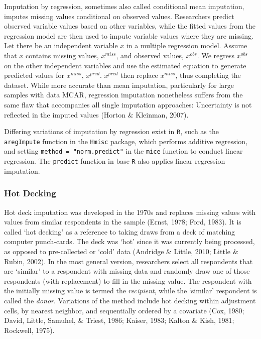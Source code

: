 \documentclass[12pt,econ]{sources/authesis}
\begin{document}
Imputation by regression, sometimes also called conditional mean imputation, imputes missing values conditional on observed values. Researchers predict observed variable values based on other variables, while the fitted values from the regression model are then used to impute variable values where they are missing. Let there be an independent variable \(x\) in a multiple regression model. Assume that \(x\) contains missing values, \(x^{miss}\), and observed values, \(x^{obs}\). We regress \(x^{obs}\) on the other independent variables and use the estimated equation to generate predicted values for \(x^{miss}\), \(x^{pred}\). \(x^{pred}\) then replace \(x^{miss}\), thus completing the dataset. While more accurate than mean imputation, particularly for large samples with data MCAR, regression imputation nonetheless suffers from the same flaw that accompanies all single imputation approaches: Uncertainty is not reflected in the imputed values (Horton \& Kleinman, 2007).

Differing variations of imputation by regression exist in \texttt{R}, such as the \texttt{aregImpute} function in the \texttt{Hmisc} package, which performs additive regression, and setting \texttt{method\ =\ "norm.predict"} in the \texttt{mice} function to conduct linear regression. The \texttt{predict} function in base \texttt{R} also applies linear regression imputation.

\hypertarget{ordmiss-theory-impute-hd}{%
\subsubsection{Hot Decking}\label{ordmiss-theory-impute-hd}}

Hot deck imputation was developed in the 1970s and replaces missing values with values from similar respondents in the sample (Ernst, 1978; Ford, 1983). It is called `hot decking' as a reference to taking draws from a deck of matching computer punch-cards. The deck was `hot' since it was currently being processed, as opposed to pre-collected or `cold' data (Andridge \& Little, 2010; Little \& Rubin, 2002). In the most general version, researchers select all respondents that are `similar' to a respondent with missing data and randomly draw one of those respondents (with replacement) to fill in the missing value. The respondent with the initially missing value is termed the \textit{recipient}, while the `similar' respondent is called the \textit{donor}. Variations of the method include hot decking within adjustment cells, by nearest neighbor, and sequentially ordered by a covariate (Cox, 1980; David, Little, Samuhel, \& Triest, 1986; Kaiser, 1983; Kalton \& Kish, 1981; Rockwell, 1975).
\end{document}
